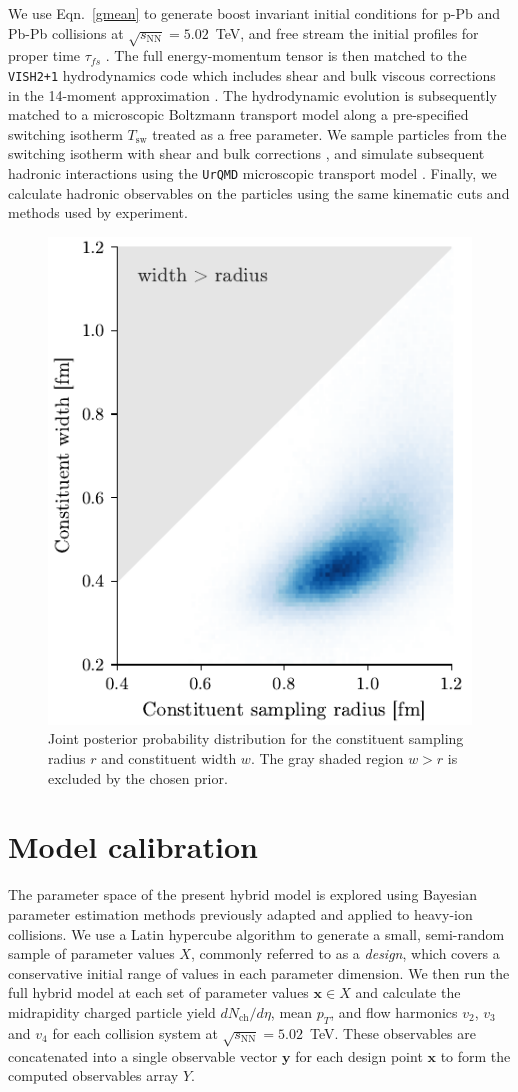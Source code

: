 \documentclass[3p,times,procedia,sort&compress]{elsarticle}
\newcommand{\sqrts}{\sqrt{s_\mathrm{NN}}}
\begin{document}
We use Eqn.~\eqref{gmean} to generate boost invariant initial conditions for p-Pb and Pb-Pb collisions at $\sqrts=5.02$~TeV, and free stream the initial profiles for proper time $\tau_{fs}$ \cite{Liu:2015nwa}.
The full energy-momentum tensor is then matched to the \texttt{VISH2+1} hydrodynamics code \cite{Song:2007ux, Shen:2014vra} which includes shear and bulk viscous corrections in the 14-moment approximation \cite{Bernhard:2016tnd}.
The hydrodynamic evolution is subsequently matched to a microscopic Boltzmann transport model along a pre-specified switching isotherm $T_\text{sw}$ treated as a free parameter.
We sample particles from the switching isotherm with shear and bulk corrections \cite{Bernhard:2018hnz}, and simulate subsequent hadronic interactions using the \texttt{UrQMD} microscopic transport model \cite{Bass:1998ca}.
Finally, we calculate hadronic observables on the particles using the same kinematic cuts and methods used by experiment.

\begin{figure}
  \includegraphics[width=.45\textwidth]{proton_posterior_shape}
  \caption{\label{fig:proton_shape} Joint posterior probability distribution for the constituent sampling radius $r$ and constituent width $w$. The gray shaded region $w > r$ is excluded by the chosen prior.}
\end{figure}

\section{Model calibration}

The parameter space of the present hybrid model is explored using Bayesian parameter estimation methods previously adapted and applied to heavy-ion collisions.
We use a Latin hypercube algorithm to generate a small, semi-random sample of parameter values $X$, commonly referred to as a \emph{design}, which covers a conservative initial range of values in each parameter dimension.
We then run the full hybrid model at each set of parameter values $\mathbf{x} \in X$ and calculate the midrapidity charged particle yield $dN_\text{ch}/d\eta$, mean $p_T$, and flow harmonics $v_2$, $v_3$ and $v_4$ for each collision system at $\sqrts=5.02$~TeV.
These observables are concatenated into a single observable vector $\mathbf{y}$ for each design point $\mathbf{x}$ to form the computed observables array $Y$.
\end{document}
